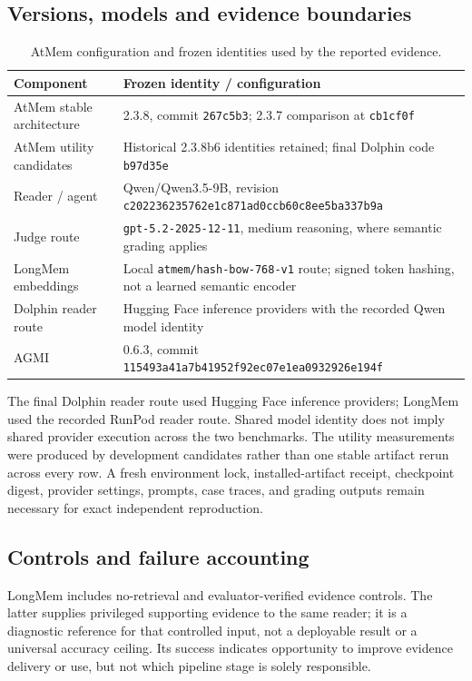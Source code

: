 \documentclass[11pt]{article}
\newcommand{\code}[1]{\texttt{\small #1}}
\begin{document}
\subsection{Versions, models and evidence boundaries}
\begin{table}[t]
\centering\small
\begin{tabularx}{\linewidth}{p{.23\linewidth}Y}
\toprule
Component & Frozen identity / configuration\\\midrule
AtMem stable architecture & 2.3.8, commit \code{267c5b3}; 2.3.7 comparison at \code{cb1cf0f}\\
AtMem utility candidates & Historical 2.3.8b6 identities retained; final Dolphin code \code{b97d35e}\\
Reader / agent & Qwen/Qwen3.5-9B, revision \code{c202236235762e1c871ad0ccb60c8ee5ba337b9a}\\
Judge route & \code{gpt-5.2-2025-12-11}, medium reasoning, where semantic grading applies\\
LongMem embeddings & Local \code{atmem/hash-bow-768-v1} route; signed token hashing, not a learned semantic encoder\\
Dolphin reader route & Hugging Face inference providers with the recorded Qwen model identity\\
AGMI & 0.6.3, commit \code{115493a41a7b41952f92ec07e1ea0932926e194f}\\\bottomrule
\end{tabularx}
\caption{AtMem configuration and frozen identities used by the reported evidence.}
\label{tab:config}
\end{table}

The final Dolphin reader route used Hugging Face inference providers; LongMem used the recorded RunPod reader route. Shared model identity does not imply shared provider execution across the two benchmarks. The utility measurements were produced by development candidates rather than one stable artifact rerun across every row. A fresh environment lock, installed-artifact receipt, checkpoint digest, provider settings, prompts, case traces, and grading outputs remain necessary for exact independent reproduction.

\subsection{Controls and failure accounting}
LongMem includes no-retrieval and evaluator-verified evidence controls. The latter supplies privileged supporting evidence to the same reader; it is a diagnostic reference for that controlled input, not a deployable result or a universal accuracy ceiling. Its success indicates opportunity to improve evidence delivery or use, but not which pipeline stage is solely responsible.
\end{document}
